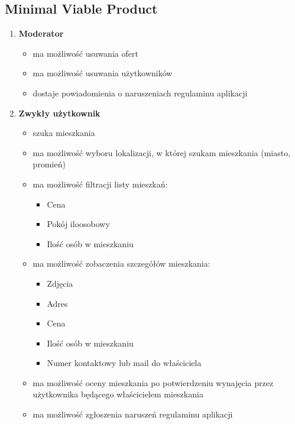 \documentclass[polish, 11pt]{article}
\begin{document}
    \subsection{Minimal Viable Product}
        \begin{enumerate}
            \item \textbf{Moderator}
            \begin{itemize}
                \item ma możliwość usuwania ofert
                \item ma możliwość usuwania użytkowników
                \item dostaje powiadomienia o naruszeniach regulaminu aplikacji
            \end{itemize}
            
            \item \textbf{Zwykły użytkownik}
            \begin{itemize}
                \item szuka mieszkania
                \item ma możliwość wyboru lokalizacji, w której szukam mieszkania (miasto, promień)
                
                \item ma możliwość filtracji listy mieszkań:
                \begin{itemize}
                    \item Cena
                    \item Pokój iloosobowy
                    \item Ilość osób w mieszkaniu
                \end{itemize}
                
                \item ma możliwość zobaczenia szczegółów mieszkania:
                \begin{itemize}
                    \item Zdjęcia
                    \item Adres
                    \item Cena
                    \item Ilość osób w mieszkaniu
                    \item Numer kontaktowy lub mail do właściciela
                \end{itemize}
                
                \item ma możliwość oceny mieszkania po potwierdzeniu wynajęcia przez użytkownika będącego  właścicielem mieszkania
                \item ma możliwość zgłoszenia naruszeń regulaminu aplikacji
            \end{itemize}
            

\end{enumerate}
\end{document}
